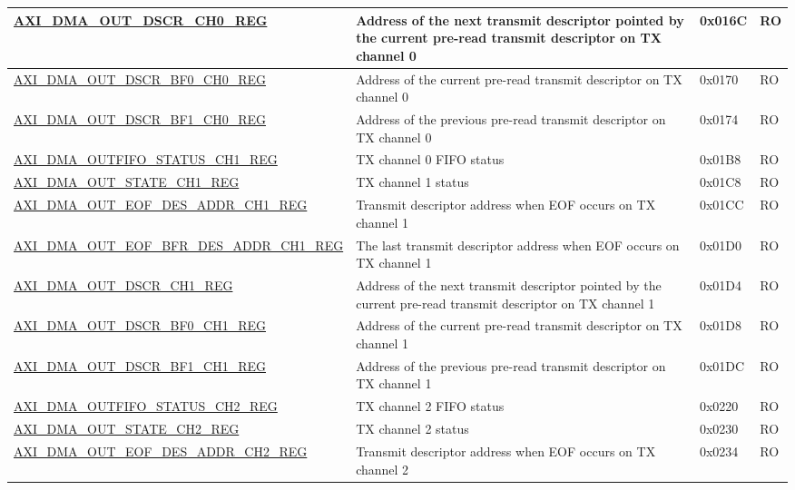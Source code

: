 \begin{longtable}{ | l | p{10cm} | p{1.3cm} | l | }
\hyperref[regdesc:AXIDMAOUTDSCRCHNREG]{AXI\_DMA\_OUT\_DSCR\_CH0\_REG} & Address of the next transmit descriptor pointed by the current pre-read transmit descriptor on TX channel 0 & 0x016C & RO \\ \hline
\hyperref[regdesc:AXIDMAOUTDSCRBF0CHNREG]{AXI\_DMA\_OUT\_DSCR\_BF0\_CH0\_REG} & Address of the current pre-read transmit descriptor on TX channel 0 & 0x0170 & RO \\ \hline
\hyperref[regdesc:AXIDMAOUTDSCRBF1CHNREG]{AXI\_DMA\_OUT\_DSCR\_BF1\_CH0\_REG} & Address of the previous pre-read transmit descriptor on TX channel 0 & 0x0174 & RO \\ \hline
\hyperref[regdesc:AXIDMAOUTFIFOSTATUSCHNREG]{AXI\_DMA\_OUTFIFO\_STATUS\_CH1\_REG} & TX channel 0 FIFO status & 0x01B8 & RO \\ \hline
\hyperref[regdesc:AXIDMAOUTSTATECHNREG]{AXI\_DMA\_OUT\_STATE\_CH1\_REG} & TX channel 1 status & 0x01C8 & RO \\ \hline
\hyperref[regdesc:AXIDMAOUTEOFDESADDRCHNREG]{AXI\_DMA\_OUT\_EOF\_DES\_ADDR\_CH1\_REG} & Transmit descriptor address when EOF occurs on TX channel 1 & 0x01CC & RO \\ \hline
\hyperref[regdesc:AXIDMAOUTEOFBFRDESADDRCHNREG]{AXI\_DMA\_OUT\_EOF\_BFR\_DES\_ADDR\_CH1\_REG} & The last transmit descriptor address when EOF occurs on TX channel 1 & 0x01D0 & RO \\ \hline
\hyperref[regdesc:AXIDMAOUTDSCRCHNREG]{AXI\_DMA\_OUT\_DSCR\_CH1\_REG} & Address of the next transmit descriptor pointed by the current pre-read transmit descriptor on TX channel 1 & 0x01D4 & RO \\ \hline
\hyperref[regdesc:AXIDMAOUTDSCRBF0CHNREG]{AXI\_DMA\_OUT\_DSCR\_BF0\_CH1\_REG} & Address of the current pre-read transmit descriptor on TX channel 1 & 0x01D8 & RO \\ \hline
\hyperref[regdesc:AXIDMAOUTDSCRBF1CHNREG]{AXI\_DMA\_OUT\_DSCR\_BF1\_CH1\_REG} & Address of the previous pre-read transmit descriptor on TX channel 1 & 0x01DC & RO \\ \hline
\hyperref[regdesc:AXIDMAOUTFIFOSTATUSCHNREG]{AXI\_DMA\_OUTFIFO\_STATUS\_CH2\_REG} & TX channel 2 FIFO status & 0x0220 & RO \\ \hline
\hyperref[regdesc:AXIDMAOUTSTATECHNREG]{AXI\_DMA\_OUT\_STATE\_CH2\_REG} & TX channel 2 status & 0x0230 & RO \\ \hline
\hyperref[regdesc:AXIDMAOUTEOFDESADDRCHNREG]{AXI\_DMA\_OUT\_EOF\_DES\_ADDR\_CH2\_REG} & Transmit descriptor address when EOF occurs on TX channel 2 & 0x0234 & RO \\ \hline

\end{longtable}
